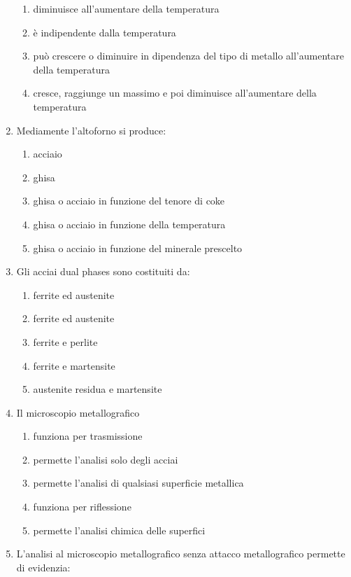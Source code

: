 \begin{enumerate}
\begin{enumerate}
        \item diminuisce all’aumentare della temperatura
        \item è indipendente dalla temperatura
        \item può crescere o diminuire in dipendenza del tipo di metallo all’aumentare della temperatura
        \item cresce, raggiunge un massimo e poi diminuisce all’aumentare della temperatura
    \end{enumerate}
    \item Mediamente l’altoforno si produce:
    \begin{enumerate}
        \item acciaio
        \item ghisa
        \item ghisa o acciaio in funzione del tenore di coke
        \item ghisa o acciaio in funzione della temperatura
        \item ghisa o acciaio in funzione del minerale prescelto
    \end{enumerate}
    \item Gli acciai dual phases sono costituiti da:
    \begin{enumerate}
        \item ferrite ed austenite
        \item ferrite ed austenite
        \item ferrite e perlite
        \item ferrite e martensite
        \item austenite residua e martensite
    \end{enumerate}
    \item Il microscopio metallografico
    \begin{enumerate}
        \item funziona per trasmissione
        \item permette l’analisi solo degli acciai
        \item permette l’analisi di qualsiasi superficie metallica
        \item funziona per riflessione
        \item permette l’analisi chimica delle superfici
    \end{enumerate}
    \item L’analisi al microscopio metallografico senza attacco metallografico permette di evidenzia:
    \begin{enumerate}

\end{enumerate}
\end{enumerate}
